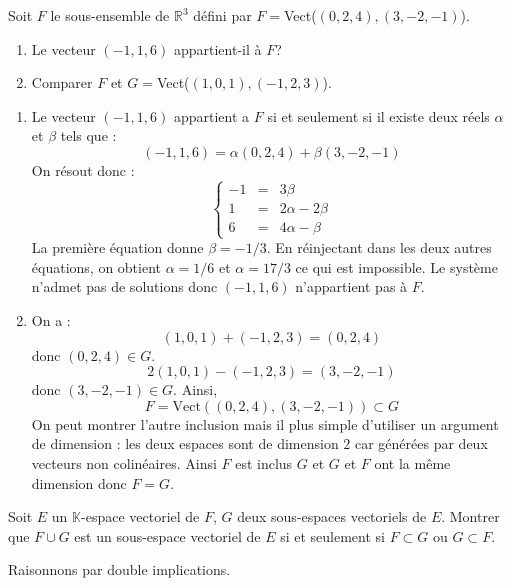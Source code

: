 \documentclass[a4paper,10pt]{report}
\begin{document}
\medskip



\begin{Exa} Soit $F$ le sous-ensemble de $\mathbb{R}^3$ défini par $F=$Vect($(0,2,4), (3,-2,-1)$).
\begin{enumerate}
\item Le vecteur $(-1,1,6)$ appartient-il à $F$?
\item Comparer $F$ et $G=$Vect($(1,0,1), (-1,2,3)$).
\end{enumerate}
\end{Exa}

\corr 
\begin{enumerate}
\item Le vecteur $(-1,1,6)$ appartient a $F$ si et seulement si il existe deux réels $\alpha$ et $\beta$ tels que :
$$ (-1,1,6) = \alpha (0,2,4) + \beta (3,-2,-1)$$
On résout donc :
$$ \left\lbrace \begin{array}{ccl}
-1 & = & 3 \beta \\
1 & = & 2 \alpha - 2 \beta \\
6 & = & 4 \alpha - \beta
\end{array}\right.$$
La première équation donne $\beta = -1/3$. En réinjectant dans les deux autres équations, on obtient $\alpha=1/6$ et $\alpha = 17/3$ ce qui est impossible. Le système n'admet pas de solutions donc $(-1,1,6)$ n'appartient pas à $F$.
\item On a :
$$ (1,0,1) + (-1,2,3) =(0,2,4)$$
donc $(0,2,4) \in G$.
$$ 2(1,0,1) -(-1,2,3) = (3,-2,-1)$$
donc $(3,-2,-1) \in G$. Ainsi,
$$ F=\textrm{Vect}((0,2,4), (3,-2,-1)) \subset G$$
On peut montrer l'autre inclusion mais il plus simple d'utiliser un argument de dimension : les deux espaces sont de dimension $2$ car générées par deux vecteurs non colinéaires. Ainsi $F$ est inclus $G$ et $G$ et $F$ ont la même dimension donc $F=G$.
\end{enumerate}

\medskip

\begin{Exa} Soit $E$ un $\mathbb{K}$-espace vectoriel de $F$, $G$ deux sous-espaces vectoriels de $E$. Montrer que $F \cup G$ est un sous-espace vectoriel de $E$ si et seulement si $F \subset G$ ou $G \subset F$.
\end{Exa}

\corr Raisonnons par double implications.
\end{document}
